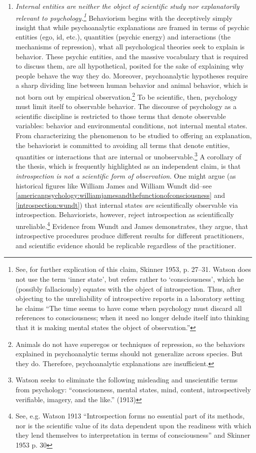 \begin{refsection}
\begin{enumerate}
\item \emph{Internal entities are neither the object of scientific study nor explanatorily relevant to psychology.\footnote{See, for further explication of this claim, Skinner 1953, p. 27--31. Watson does not use the term `inner state', but refers rather to `consciousness', which he (possibly fallaciously) equates with the object of introspection. Thus, after objecting to the unreliability of introspective reports in a laboratory setting he claims ``The time seems to have come when psychology must discard all references to consciousness; when it need no longer delude itself into thinking that it is making mental states the object of observation.''}} Behaviorism begins with the deceptively simply insight that while psychoanalytic explanations are framed in terms of psychic entities (ego, id, etc.), quantities (psychic energy) and interactions (the mechanisms of repression), what all psychological theories seek to explain is behavior. These psychic entities, and the massive vocabulary that is required to discuss them, are all hypothetical, posited for the sake of explaining why people behave the way they do. Moreover, psychoanalytic hypotheses require a sharp dividing line between human behavior and animal behavior, which is not born out by empirical observation.\footnote{Animals do not have superegos or techniques of repression, so the behaviors explained in psychoanalytic terms should not generalize across species. But they do. Therefore, psychoanalytic explanations are insufficient.}
To be scientific, then, psychology must limit itself to observable behavior. The discourse of psychology as a scientific discipline is restricted to those terms that denote observable variables: behavior and environmental conditions, not internal mental states. From characterizing the phenomenon to be studied to offering an explanation, the behaviorist is committed to avoiding all terms that denote entities, quantities or interactions that are internal or unobservable.\footnote{Watson seeks to eliminate the following misleading and unscientific terms from psychology: ``consciousness, mental states, mind, content, introspectively verifiable, imagery, and the like.'' (1913)}
A corollary of the thesis, which is frequently highlighted as an independent claim, is that \emph{introspection is not a scientific form of observation}. One might argue (as historical figures like William James and William Wundt did–see \ref{americanpsychology:williamjamesandthefunctionofconsciousness} and \ref{introspection:wundt}) that internal states \emph{are} scientifically observable via introspection. Behaviorists, however, reject introspection as scientifically unreliable.\footnote{See, e.g. Watson 1913 ``Introspection forms no essential part of its methods, nor is the scientific value of its data dependent upon the readiness with which they lend themselves to interpretation in terms of consciousness'' and Skinner 1953 p. 30} Evidence from Wundt and James demonstrates, they argue, that introspective procedures produce different results for different practitioners, and scientific evidence should be replicable regardless of the practitioner.

\end{enumerate}
\end{refsection}
